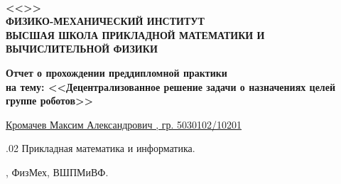 \thispagestyle{empty}%
\makeatletter
{}
%
\makeatother



{\centering%
	\small%
	\MakeUppercase{\SPbPUOfficialPrefix}\\
	{\bfseries %
	<<\MakeUppercase{\SPbPU}>>\\%
	\MakeUppercase{ФИЗИКО-МЕХАНИЧЕСКИЙ ИНСТИТУТ}\\
	\MakeUppercase{ВЫСШАЯ ШКОЛА ПРИКЛАДНОЙ МАТЕМАТИКИ И ВЫЧИСЛИТЕЛЬНОЙ ФИЗИКИ}
	}
\par}%
	

\vspace{0pt plus1fill} %


\noindent




{\centering%
	{\bfseries{} 
	Отчет о прохождении преддипломной практики\\
	на тему: <<Децентрализованное решение задачи о назначениях целей группе роботов>>}\\

\intervalS\normalfont%

	\uline{Кромачев Максим Александрович , гр. 5030102/10201}%

\intervalS\normalfont%

\par}%



{ {\expandafter {}.02 Прикладная математика и информатика}.}\par


{ {\expandafter {}, ФизМех, ВШПМиВФ}.} %


